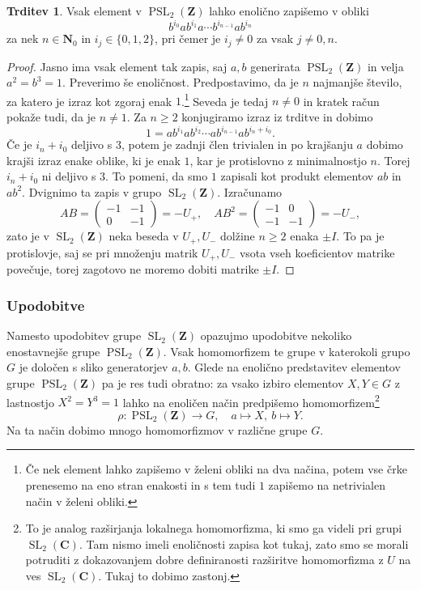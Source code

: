 \documentclass[11pt]{book}
\def\NN{\mathbf{N}}
\def\ZZ{\mathbf{Z}}
\def\CC{\mathbf{C}}
\DeclareMathOperator\SL{SL}
\DeclareMathOperator\PSL{PSL}
\theoremstyle{definition}
\theoremstyle{zgled}
\theoremstyle{odprtproblem}
\theoremstyle{domacanaloga}
\newenvironment{dokaz}
    {\color{siva}\begin{proof}}
    {\end{proof}}
\theoremstyle{izrek}
\newtheorem*{trditev}{Trditev}
\begin{document}
\begin{trditev}
Vsak element v $\PSL_2(\ZZ)$ lahko enolično zapišemo v obliki
\[
    b^{i_0} a b^{i_1} a \cdots b^{i_{n-1}} a b^{i_n}
\]
za nek $n \in \NN_0$ in $i_j \in \{0,1,2 \}$, pri čemer je $i_j \neq 0$ za vsak $j \neq 0,n$.
\end{trditev}
\begin{dokaz}
Jasno ima vsak element tak zapis, saj $a,b$ generirata $\PSL_2(\ZZ)$ in velja $a^2 = b^3 = 1$. Preverimo še enoličnost. Predpostavimo, da je $n$ najmanjše število, za katero je izraz kot zgoraj enak $1$.\footnote{Če nek element lahko zapišemo v želeni obliki na dva načina, potem vse črke prenesemo na eno stran enakosti in s tem tudi $1$ zapišemo na netrivialen način v želeni obliki.} Seveda je tedaj $n \neq 0$ in kratek račun pokaže tudi, da je $n \neq 1$. Za $n \geq 2$ konjugiramo izraz iz trditve in dobimo
\[
    1 = a b^{i_1} a b^{i_2} \cdots a b^{i_{n-1}} a b^{i_n + i_0}.
\]
Če je $i_n + i_0$ deljivo s $3$, potem je zadnji člen trivialen in po krajšanju $a$ dobimo krajši izraz enake oblike, ki je enak $1$, kar je protislovno z minimalnostjo $n$. Torej $i_n + i_0$ ni deljivo s $3$. To pomeni, da smo $1$ zapisali kot produkt elementov $ab$ in $ab^2$. Dvignimo ta zapis v grupo $\SL_2(\ZZ)$. Izračunamo
\[
    AB = \begin{pmatrix}
        -1 & -1 \\ 0 & -1
    \end{pmatrix}
    = - U_+, \quad
    AB^2 = \begin{pmatrix}
        -1 & 0 \\ -1 & -1
    \end{pmatrix}
    = - U_-,
\]
zato je v $\SL_2(\ZZ)$ neka beseda v $U_+, U_-$ dolžine $n \geq 2$ enaka $\pm I$. To pa je protislovje, saj se pri množenju matrik $U_+, U_-$ vsota vseh koeficientov matrike povečuje, torej zagotovo ne moremo dobiti matrike $\pm I$.
\end{dokaz}

\subsubsection{Upodobitve}

Namesto upodobitev grupe $\SL_2(\ZZ)$ opazujmo upodobitve nekoliko enostavnejše grupe $\PSL_2(\ZZ)$. Vsak homomorfizem te grupe v katerokoli grupo $G$ je določen s sliko generatorjev $a,b$. Glede na enolično predstavitev elementov grupe $\PSL_2(\ZZ)$ pa je res tudi obratno: za vsako izbiro elementov $X,Y \in G$ z lastnostjo $X^2 = Y^3 = 1$ lahko na enoličen način predpišemo homomorfizem\footnote{To je analog razširjanja lokalnega homomorfizma, ki smo ga videli pri grupi $\SL_2(\CC)$. Tam nismo imeli enoličnosti zapisa kot tukaj, zato smo se morali potruditi z dokazovanjem dobre definiranosti razširitve homomorfizma z $U$ na ves $\SL_2(\CC)$. Tukaj to dobimo zastonj.}
\[
    \textstyle \rho 
    \colon \PSL_2(\ZZ) \to G, \quad
    a \mapsto X, \ b \mapsto Y.
\]
Na ta način dobimo mnogo homomorfizmov v različne grupe $G$.
\end{document}

